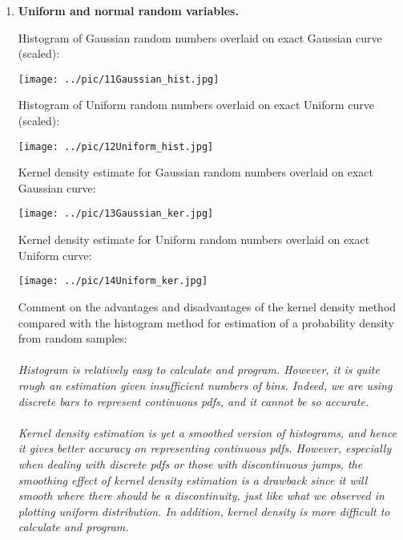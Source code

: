 \documentclass[12pt]{article}
\begin{document}
\begin{enumerate}
\item {\bf Uniform and normal random variables.}

Histogram of Gaussian random numbers overlaid on exact Gaussian curve (scaled):


\texttt{[image: ../pic/11Gaussian\_hist.jpg]}

\vspace{3in}

Histogram of Uniform random numbers overlaid on exact Uniform curve (scaled):

\texttt{[image: ../pic/12Uniform\_hist.jpg]}

\vspace{0.5cm}

Kernel density estimate for Gaussian random numbers overlaid on exact Gaussian curve:

\texttt{[image: ../pic/13Gaussian\_ker.jpg]}

\vspace{3in}

Kernel density estimate for Uniform random numbers overlaid on exact Uniform curve:

\texttt{[image: ../pic/14Uniform\_ker.jpg]}

\vspace{1cm}
  
Comment on the advantages and disadvantages of the kernel density method compared with the histogram method for estimation of a probability density from random samples:
\\\\
{\em
Histogram is relatively easy to calculate and program. However, it is quite rough an estimation given insufficient numbers of bins. Indeed, we are using discrete bars to represent continuous pdfs, and it cannot be so accurate.\\\\
Kernel density estimation is yet a smoothed version of histograms, and hence it gives better accuracy on representing continuous pdfs. However, especially when dealing with discrete pdfs or those with discontinuous jumps, the smoothing effect of kernel density estimation is a drawback since it will smooth where there should be a discontinuity, just like what we observed in plotting uniform distribution. In addition, kernel density is more difficult to calculate and program.\\
}


\end{enumerate}
\end{document}

